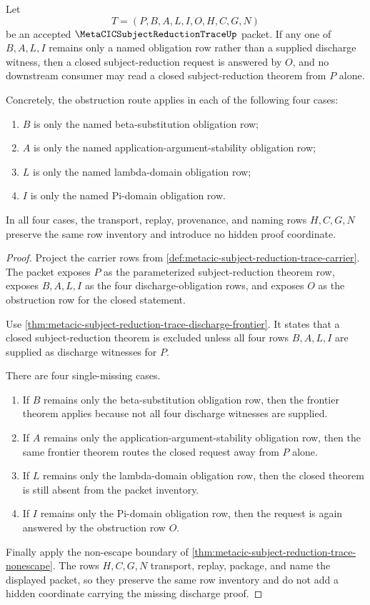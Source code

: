 \begin{theorem}
\label{thm:metacic-subject-reduction-trace-single-obligation-obstruction}
Let
$$
T=(P,B,A,L,I,O,H,C,G,N)
$$
be an accepted $\MetaCICSubjectReductionTraceUp$ packet. If any one of $B,A,L,I$ remains only a named obligation row rather than a supplied discharge witness, then a closed subject-reduction request is answered by $O$, and no downstream consumer may read a closed subject-reduction theorem from $P$ alone.

Concretely, the obstruction route applies in each of the following four cases:
\begin{enumerate}
\item $B$ is only the named beta-substitution obligation row;
\item $A$ is only the named application-argument-stability obligation row;
\item $L$ is only the named lambda-domain obligation row;
\item $I$ is only the named Pi-domain obligation row.
\end{enumerate}
In all four cases, the transport, replay, provenance, and naming rows $H,C,G,N$ preserve the same row inventory and introduce no hidden proof coordinate.
\end{theorem}
\begin{proof}
Project the carrier rows from \autoref{def:metacic-subject-reduction-trace-carrier}. The packet exposes $P$ as the parameterized subject-reduction theorem row, exposes $B,A,L,I$ as the four discharge-obligation rows, and exposes $O$ as the obstruction row for the closed statement.

Use \autoref{thm:metacic-subject-reduction-trace-discharge-frontier}. It states that a closed subject-reduction theorem is excluded unless all four rows $B,A,L,I$ are supplied as discharge witnesses for $P$.

There are four single-missing cases.
\begin{enumerate}
\item If $B$ remains only the beta-substitution obligation row, then the frontier theorem applies because not all four discharge witnesses are supplied.
\item If $A$ remains only the application-argument-stability obligation row, then the same frontier theorem routes the closed request away from $P$ alone.
\item If $L$ remains only the lambda-domain obligation row, then the closed theorem is still absent from the packet inventory.
\item If $I$ remains only the Pi-domain obligation row, then the request is again answered by the obstruction row $O$.
\end{enumerate}

Finally apply the non-escape boundary of \autoref{thm:metacic-subject-reduction-trace-nonescape}. The rows $H,C,G,N$ transport, replay, package, and name the displayed packet, so they preserve the same row inventory and do not add a hidden coordinate carrying the missing discharge proof.
\end{proof}

